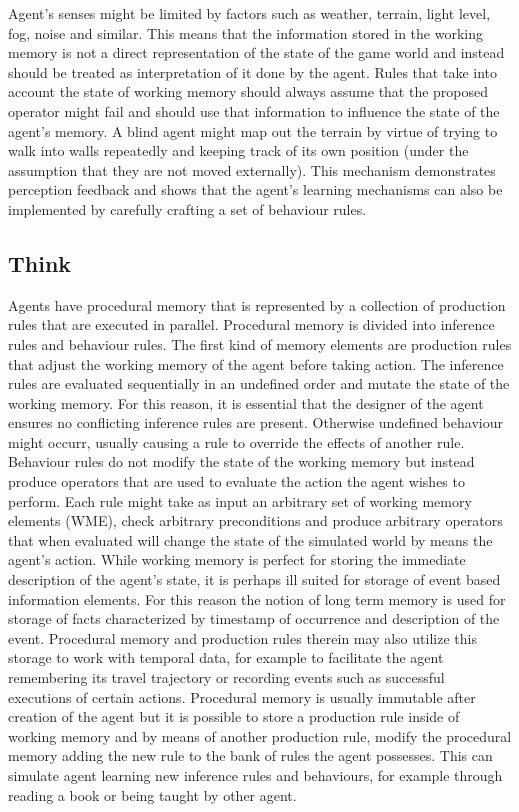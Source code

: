 Agent's senses might be limited by factors such as weather, terrain, light level, fog, noise and similar.
This means that the information stored in the working memory is not a direct representation of the state of the game world and instead should be treated as interpretation of it done by the agent.
Rules that take into account the state of working memory should always assume that the proposed operator might fail and should use that information to influence the state of the agent's memory.
A blind agent might map out the terrain by virtue of trying to walk into walls repeatedly and keeping track of its own position (under the assumption that they are not moved externally).
This mechanism demonstrates perception feedback and shows that the agent's learning mechanisms can also be implemented by carefully crafting a set of behaviour rules.

\subsection{Think}

Agents have procedural memory that is represented by a collection of production rules that are executed in parallel.
Procedural memory is divided into inference rules and behaviour rules.
The first kind of memory elements are production rules that adjust the working memory of the agent before taking action.
The inference rules are evaluated sequentially in an undefined order and mutate the state of the working memory.
For this reason, it is essential that the designer of the agent ensures no conflicting inference rules are present.
Otherwise undefined behaviour might occurr, usually causing a rule to override the effects of another rule.
Behaviour rules do not modify the state of the working memory but instead produce operators that are used to evaluate the action the agent wishes to perform.
Each rule might take as input an arbitrary set of working memory elements (WME), check arbitrary preconditions and produce arbitrary operators that when evaluated will change the state of the simulated world by means the agent's action.
While working memory is perfect for storing the immediate description of the agent's state, it is perhaps ill suited for storage of event based information elements.
For this reason the notion of long term memory is used for storage of facts characterized by timestamp of occurrence and description of the event.
Procedural memory and production rules therein may also utilize this storage to work with temporal data, for example to facilitate the agent remembering its travel trajectory or recording events such as successful executions of certain actions.
Procedural memory is usually immutable after creation of the agent but it is possible to store a production rule inside of working memory and by means of another production rule, modify the procedural memory adding the new rule to the bank of rules the agent possesses.
This can simulate agent learning new inference rules and behaviours, for example through reading a book or being taught by other agent.

